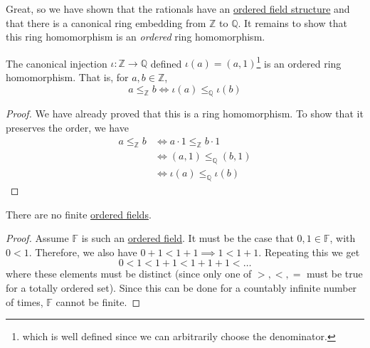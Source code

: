   Great, so we have shown that the rationals have an \hyperref[thm:ordered-field-structure]{ordered field structure} and that there is a canonical ring embedding from $\mathbb{Z}$ to $\mathbb{Q}$. It remains to show that this ring homomorphism is an \textit{ordered} ring homomorphism. 

  \begin{theorem}
    \label{thm:canonical-injection-of-z-to-q-is-an-ordered}
    The canonical injection $\iota: \mathbb{Z} \rightarrow \mathbb{Q}$ defined $\iota(a) = (a, 1)$\footnote{which is well defined since we can arbitrarily choose the denominator.} is an ordered ring homomorphism. That is, for $a, b \in \mathbb{Z}$, 
    \begin{equation}
      a \leq_{\mathbb{Z}} b \iff \iota(a) \leq_{\mathbb{Q}} \iota(b)
    \end{equation}
  \end{theorem}
  \begin{proof} 
    We have already proved that this is a ring homomorphism. To show that it preserves the order, we have 
    \begin{align}
      a \leq_{\mathbb{Z}} b & \iff a \cdot 1 \leq_{\mathbb{Z}} b \cdot 1 \\
                            & \iff (a, 1) \leq_{\mathbb{Q}} (b, 1) \\
                            & \iff \iota(a) \leq_{\mathbb{Q}} \iota(b)
    \end{align}
  \end{proof} 

  \begin{theorem}
    \label{thm:finite-fields}
    There are no finite \hyperref[def:ordered-field]{ordered fields}. 
  \end{theorem} 
  \begin{proof}
    Assume $\mathbb{F}$ is such an \hyperref[def:ordered-field]{ordered field}. It must be the case that $0, 1 \in \mathbb{F}$, with $0 < 1$. Therefore, we also have $0 + 1 < 1 + 1 \implies 1 < 1 + 1$. Repeating this we get 
    \begin{equation}
      0 < 1 < 1 + 1 < 1 + 1 + 1 < \ldots
    \end{equation}
    where these elements must be distinct (since only one of $>, <, =$ must be true for a totally ordered set). Since this can be done for a countably infinite number of times, $\mathbb{F}$ cannot be finite. 
  \end{proof}

